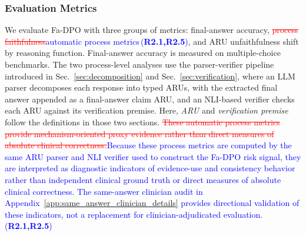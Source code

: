\documentclass[a4paper,fleqn,doubleblind]{cas-sc}
\DeclareRobustCommand{\deleted}[1]{\textcolor{red}{\sout{#1}}}
\DeclareRobustCommand{\added}[1]{\textcolor{blue}{#1}}
\DeclareRobustCommand{\revtag}[1]{\textcolor{blue}{\scriptsize\,(\textbf{#1})}}
\begin{document}
\subsubsection{Evaluation Metrics}
\label{subsubsec:eval_metrics}
We evaluate Fa-DPO with three groups of metrics: final-answer accuracy, \deleted{process faithfulness}\added{automatic process metrics}\revtag{R2.1,R2.5}, and ARU unfaithfulness shift by reasoning function. Final-answer accuracy is measured on multiple-choice benchmarks. The two process-level analyses use the parser-verifier pipeline introduced in Sec.~\ref{sec:decomposition} and Sec.~\ref{sec:verification}, where an LLM parser decomposes each response into typed ARUs, with the extracted final answer appended as a final-answer claim ARU, and an NLI-based verifier checks each ARU against its verification premise. Here, \emph{ARU} and \emph{verification premise} follow the definitions in those two sections. \deleted{These automatic process metrics provide mechanism-oriented proxy evidence rather than direct measures of absolute clinical correctness.}\added{Because these process metrics are computed by the same ARU parser and NLI verifier used to construct the Fa-DPO risk signal, they are interpreted as diagnostic indicators of evidence-use and consistency behavior rather than independent clinical ground truth or direct measures of absolute clinical correctness. The same-answer clinician audit in Appendix~\ref{app:same_answer_clinician_details} provides directional validation of these indicators, not a replacement for clinician-adjudicated evaluation.}\revtag{R2.1,R2.5}
\end{document}
